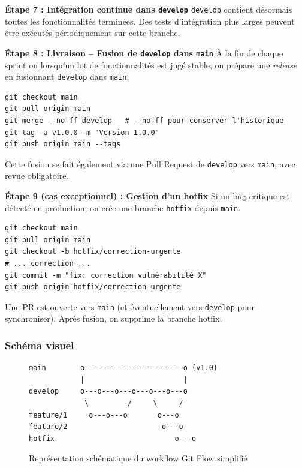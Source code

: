 \documentclass[11pt,a4paper]{article}
\begin{document}
\begin{etapebox}
\textbf{Étape 7 : Intégration continue dans \texttt{develop}}
\texttt{develop} contient désormais toutes les fonctionnalités terminées. Des tests d’intégration plus larges peuvent être exécutés périodiquement sur cette branche.
\end{etapebox}

\begin{etapebox}
\textbf{Étape 8 : Livraison – Fusion de \texttt{develop} dans \texttt{main}}
À la fin de chaque sprint ou lorsqu’un lot de fonctionnalités est jugé stable, on prépare une \textit{release} en fusionnant \texttt{develop} dans \texttt{main}.
\begin{verbatim}
git checkout main
git pull origin main
git merge --no-ff develop   # --no-ff pour conserver l'historique
git tag -a v1.0.0 -m "Version 1.0.0"
git push origin main --tags
\end{verbatim}
Cette fusion se fait également via une Pull Request de \texttt{develop} vers \texttt{main}, avec revue obligatoire.
\end{etapebox}

\begin{etapebox}
\textbf{Étape 9 (cas exceptionnel) : Gestion d’un hotfix}
Si un bug critique est détecté en production, on crée une branche \texttt{hotfix} depuis \texttt{main}.
\begin{verbatim}
git checkout main
git pull origin main
git checkout -b hotfix/correction-urgente
# ... correction ...
git commit -m "fix: correction vulnérabilité X"
git push origin hotfix/correction-urgente
\end{verbatim}
Une PR est ouverte vers \texttt{main} (et éventuellement vers \texttt{develop} pour synchroniser). Après fusion, on supprime la branche hotfix.
\end{etapebox}

\subsubsection{Schéma visuel}
\begin{figure}[H]
\centering
\begin{tcolorbox}[colback=graylight, colframe=primary, width=0.9\textwidth, arc=4pt]
\begin{verbatim}
main        o-----------------------o (v1.0)
            |                       |
develop     o---o---o---o---o---o---o
             \         /     \     /
feature/1     o---o---o       o---o
feature/2                      o---o
hotfix                            o---o
\end{verbatim}
\end{tcolorbox}
\caption{Représentation schématique du workflow Git Flow simplifié}
\end{figure}
\end{document}
